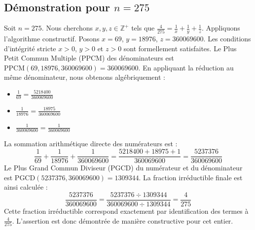 \documentclass[11pt,a4paper]{article}
\begin{document}
\subsection{Démonstration pour $n = 275$}
Soit $n = 275$. Nous cherchons $x, y, z \in \mathbb{Z}^{+}$ tels que $\frac{4}{275} = \frac{1}{x} + \frac{1}{y} + \frac{1}{z}$.
Appliquons l'algorithme constructif. Posons $x = 69$, $y = 18976$, $z = 360069600$.
Les conditions d'intégrité stricte $x > 0$, $y > 0$ et $z > 0$ sont formellement satisfaites.
Le Plus Petit Commun Multiple (PPCM) des dénominateurs est $\text{PPCM}(69, 18976, 360069600) = 360069600$.
En appliquant la réduction au même dénominateur, nous obtenons algébriquement :
\begin{itemize}
    \item $\frac{1}{69} = \frac{5218400}{360069600}$
    \item $\frac{1}{18976} = \frac{18975}{360069600}$
    \item $\frac{1}{360069600} = \frac{1}{360069600}$
\end{itemize}
La sommation arithmétique directe des numérateurs est :
$$ \frac{1}{69} + \frac{1}{18976} + \frac{1}{360069600} = \frac{5218400 + 18975 + 1}{360069600} = \frac{5237376}{360069600} $$
Le Plus Grand Commun Diviseur (PGCD) du numérateur et du dénominateur est $\text{PGCD}(5237376, 360069600) = 1309344$.
La fraction irréductible finale est ainsi calculée :
$$ \frac{5237376}{360069600} = \frac{5237376 \div 1309344}{360069600 \div 1309344} = \frac{4}{275} $$
Cette fraction irréductible correspond exactement par identification des termes à $\frac{4}{275}$. L'assertion est donc démontrée de manière constructive pour cet entier.
\end{document}
